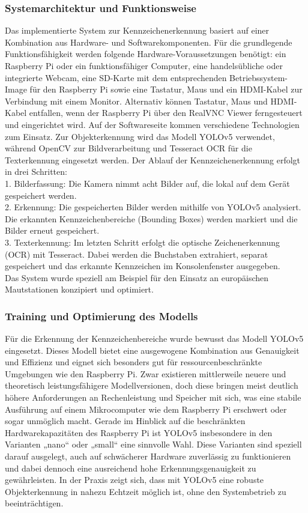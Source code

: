 \subsubsection{Systemarchitektur und Funktionsweise}
Das implementierte System zur Kennzeichenerkennung basiert auf einer Kombination aus Hardware- und Softwarekomponenten. Für die grundlegende Funktionsfähigkeit werden folgende Hardware-Voraussetzungen benötigt: ein Raspberry Pi oder ein funktionsfähiger Computer, eine handelsübliche oder integrierte Webcam, eine SD-Karte mit dem entsprechenden Betriebssystem-Image für den Raspberry Pi sowie eine Tastatur, Maus und ein HDMI-Kabel zur Verbindung mit einem Monitor. Alternativ können Tastatur, Maus und HDMI-Kabel entfallen, wenn der Raspberry Pi über den RealVNC Viewer ferngesteuert und eingerichtet wird.\singlespacing 
Auf der Softwareseite kommen verschiedene Technologien zum Einsatz. Zur Objekterkennung wird das Modell YOLOv5 verwendet, während OpenCV zur Bildverarbeitung und Tesseract OCR für die Texterkennung eingesetzt werden. \singlespacing
Der Ablauf der Kennzeichenerkennung erfolgt in drei Schritten: \\
1. Bilderfassung: Die Kamera nimmt acht Bilder auf, die lokal auf dem Gerät gespeichert werden.\\
2. Erkennung: Die gespeicherten Bilder werden mithilfe von YOLOv5 analysiert. Die erkannten Kennzeichenbereiche (Bounding Boxes) werden markiert und die Bilder erneut gespeichert. \\
3. Texterkennung: Im letzten Schritt erfolgt die optische Zeichenerkennung (OCR) mit Tesseract. Dabei werden die Buchstaben extrahiert, separat gespeichert und das erkannte Kennzeichen im Konsolenfenster ausgegeben. \\

Das System wurde speziell am Beispiel für den Einsatz an europäischen Mautstationen konzipiert und optimiert.

\subsubsection{Training und Optimierung des Modells}
Für die Erkennung der Kennzeichenbereiche wurde bewusst das Modell YOLOv5 eingesetzt. Dieses Modell bietet eine ausgewogene Kombination aus Genauigkeit und Effizienz und eignet sich besonders gut für ressourcenbeschränkte Umgebungen wie den Raspberry Pi. Zwar existieren mittlerweile neuere und theoretisch leistungsfähigere Modellversionen, doch diese bringen meist deutlich höhere Anforderungen an Rechenleistung und Speicher mit sich, was eine stabile Ausführung auf einem Mikrocomputer wie dem Raspberry Pi erschwert oder sogar unmöglich macht. Gerade im Hinblick auf die beschränkten Hardwarekapazitäten des Raspberry Pi ist YOLOv5 insbesondere in den Varianten „nano“ oder „small“ eine sinnvolle Wahl. Diese Varianten sind speziell darauf ausgelegt, auch auf schwächerer Hardware zuverlässig zu funktionieren und dabei dennoch eine ausreichend hohe Erkennungsgenauigkeit zu gewährleisten. In der Praxis zeigt sich, dass mit YOLOv5 eine robuste Objekterkennung in nahezu Echtzeit möglich ist, ohne den Systembetrieb zu beeinträchtigen.\\

